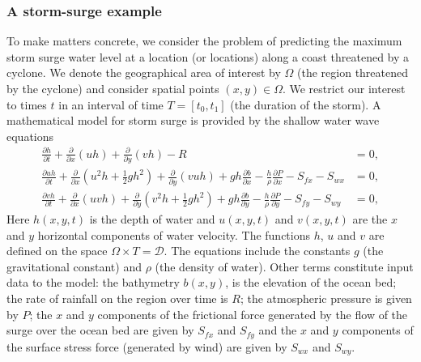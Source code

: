 

\subsubsection*{A storm-surge example}
To make matters concrete, we consider the problem of predicting the maximum 
storm surge water level at a location (or locations) along a coast threatened by a cyclone. We denote the geographical area of interest by $\Omega$ 
(the region threatened by the cyclone) and consider 
spatial points $(x,y) \in \Omega$. We restrict our interest to times $t$ in an interval of time $T = [t_0, t_1]$ (the duration of the storm). 
A mathematical model for storm surge is provided 
by the shallow water wave equations~\parencite{tan1992shallow}
\begin{subequations}
 \label{eqn:storm} 
\begin{align}
\frac{\partial h}{\partial t} +
\frac{\partial }{\partial x} \left(uh\right) + \frac{\partial }{\partial y} \left(vh\right) -R & =  0 ,\\
\frac{\partial uh}{\partial t} +
\frac{\partial }{\partial x} \left(u^2h +  \frac12 gh^2 \right) 
+ \frac{\partial }{\partial y} \left(vuh\right) + gh \frac{\partial b}{\partial x} 
- \frac{h}{\rho} \frac{\partial P}{\partial  x} - S_{fx} - S_{wx}  &= 0 ,   \\
\frac{\partial vh}{\partial t} +
\frac{\partial }{\partial x} \left(uvh  \right) 
+ \frac{\partial }{\partial y} \left(v^2h + \frac12 g h^2 \right) + gh \frac{\partial b}{\partial y} 
- \frac{h}{\rho} \frac{\partial P}{\partial  y} - S_{fy} -  S_{wy}& = 0,  
\end{align}
\end{subequations}
Here $h(x,y,t)$ is the depth of water and $u(x,y,t)$ and $v(x,y,t)$ are the $x$ and $y$ horizontal components of water velocity. 
The functions $h$, $u$ and $v$ are defined on the space $\Omega \times T = \mathcal{D}$. 
The equations include the constants $g$  (the gravitational constant) and $\rho$ (the density of water). Other terms constitute input data to the model: the bathymetry $b(x,y)$, is the elevation of the ocean bed; the rate of rainfall on the region over time is $R$; the atmospheric pressure is given by $P$; %
the $x$ and $y$ components of the frictional force generated by the flow of the surge over the ocean bed 
are given by $S_{fx}$ and $S_{fy}$ and
the $x$ and $y$ components of the surface stress force (generated by wind) are given by $S_{wx}$ and $S_{wy}$.


